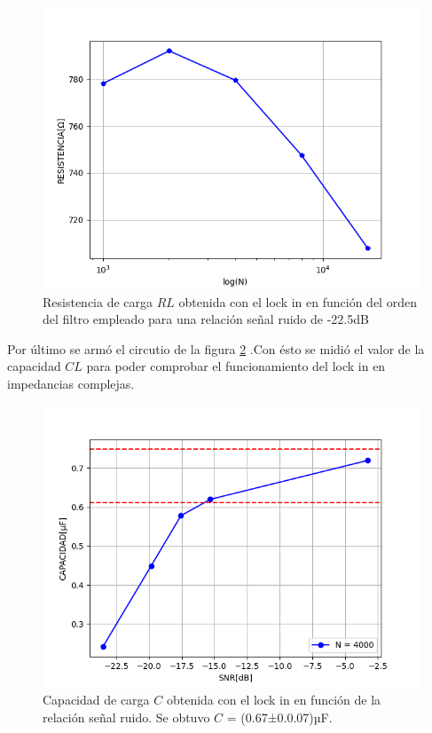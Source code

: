 \documentclass[11pt,a4paper]{extarticle}
\begin{document}
\begin{multicols}{2}
\begin{figure}[H]
	\centering
	\includegraphics[width=\linewidth]{Images/RORDEN.png}
	\caption{Resistencia de carga $RL$ obtenida con 
	el lock in en función
	del orden del filtro empleado para  
	una relación señal ruido de -22.5dB}
	\label{fig:RORDEN}
\end{figure}

Por último se armó el circutio de la figura 
\ref{fig:CvsSNR} .Con ésto 
se midió el valor de la capacidad $CL$ para poder 
comprobar el funcionamiento del lock in en 
impedancias complejas.\\ 

\begin{figure}[H]
	\centering
	\includegraphics[width=\linewidth]{Images/CvsSNR(segunda).png}
	\caption{Capacidad de carga $C$ obtenida con 
	el lock in en función
	de la relación señal ruido. Se obtuvo 
	$C$ = (0.67±0.0.07)µF.}
	\label{fig:CvsSNR}
\end{figure}



\end{multicols}
\end{document}
